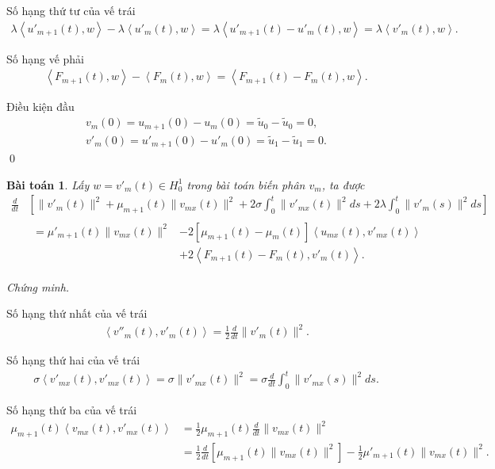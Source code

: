 \documentclass[12pt,a4paper]{article}
\newtheorem{theorem}{Bài toán}[section]
\theoremstyle{definition}
\begin{document}
Số hạng thứ tư của vế trái
\begin{align*}
    \lambda \left<u'_{m+1}(t),w\right> - \lambda \left<u'_m(t),w\right>
    = \lambda \left<u'_{m+1}(t) - u'_m(t),w\right>
    = \lambda \left<v'_m(t),w\right>.
\end{align*}

Số hạng vế phải
\begin{align*}
    \left<F_{m+1}(t),w\right> - \left<F_m(t),w\right> = \left<F_{m+1}(t) - F_m(t),w\right>.
\end{align*}

Điều kiện đầu
\begin{align*}
    v_m(0) = u_{m+1}(0) - u_m(0) = \tilde{u}_0 - \tilde{u}_0 = 0, \\
    v'_m(0) = u'_{m+1}(0) - u'_m(0) = \tilde{u}_1 - \tilde{u}_1 = 0.
\end{align*} \qed

\begin{theorem}
    Lấy $w = v'_m(t) \in H^1_0$ trong bài toán biến phân $v_m$, ta được
    \begin{align*}
        \frac{d}{dt} &\left[ \|v'_m(t)\|^2 + \mu_{m+1}(t)\|v_{mx}(t)\|^2 + 2\sigma\int_0^t \|v'_{mx}(t)\|^2 ds + 2\lambda\int_0^t \|v'_m(s)\|^2 ds \right] \\
        &\begin{aligned}
            = \mu'_{m+1}(t) \|v_{mx}(t)\|^2 &- 2[\mu_{m+1}(t) - \mu_m(t)] \left<u_{mx}(t), v'_{mx}(t)\right> \\ &+ 2\left<F_{m+1}(t) - F_m(t),v'_m(t)\right>.
        \end{aligned}
    \end{align*}
\end{theorem}

\textit{Chứng minh.}

Số hạng thứ nhất của vế trái
\begin{align*}
    \left<v''_m(t), v'_m(t)\right> = \frac{1}{2} \frac{d}{dt} \|v'_m(t)\|^2.
\end{align*}

Số hạng thứ hai của vế trái
\begin{align*}
    \sigma \left<v'_{mx}(t), v'_{mx}(t)\right> = \sigma \|v'_{mx}(t)\|^2 = \sigma \frac{d}{dt} \int_0^t \|v'_{mx}(s)\|^2 ds.
\end{align*}

Số hạng thứ ba của vế trái
\begin{align*}
    \mu_{m+1}(t) \left<v_{mx}(t),v'_{mx}(t)\right>
    &= \frac{1}{2} \mu_{m+1}(t) \frac{d}{dt} \|v_{mx}(t)\|^2 \\
    &= \frac{1}{2} \frac{d}{dt} \left[\mu_{m+1}(t) \|v_{mx}(t)\|^2\right] - \frac{1}{2} \mu'_{m+1}(t) \|v_{mx}(t)\|^2.
\end{align*}
\end{document}
